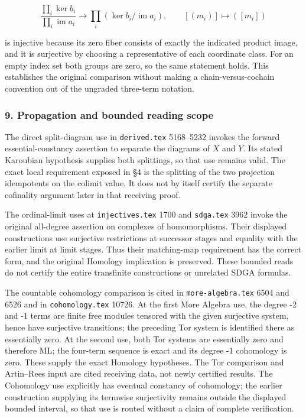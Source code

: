 \documentclass[11pt]{article}
\begin{document}
\[
\frac{\prod_i\ker b_i}{\prod_i\operatorname{im}a_i}
\longrightarrow \prod_i(\ker b_i/\operatorname{im}a_i),
\qquad [(m_i)]\longmapsto([m_i])
\]

is injective because its zero fiber consists of exactly the indicated product image, and it is surjective by choosing a representative of each coordinate class. For an empty index set both groups are zero, so the same statement holds. This establishes the original comparison without making a chain-versus-cochain convention out of the ungraded three-term notation.

\subsubsection{9. Propagation and bounded reading scope}\label{propagation-and-bounded-reading-scope}

The direct split-diagram use in \texttt{derived.tex} 5168--5232 invokes the forward essential-constancy assertion to separate the diagrams of \(X\) and \(Y\). Its stated Karoubian hypothesis supplies both splittings, so that use remains valid. The exact local requirement exposed in §4 is the splitting of the two projection idempotents on the colimit value. It does not by itself certify the separate cofinality argument later in that receiving proof.

The ordinal-limit uses at \texttt{injectives.tex} 1700 and \texttt{sdga.tex} 3962 invoke the original all-degree assertion on complexes of homomorphisms. Their displayed constructions use surjective restrictions at successor stages and equality with the earlier limit at limit stages. Thus their matching-map requirement has the correct form, and the original Homology implication is preserved. These bounded reads do not certify the entire transfinite constructions or unrelated SDGA formulas.

The countable cohomology comparison is cited in \texttt{more-algebra.tex} 6504 and 6526 and in \texttt{cohomology.tex} 10726. At the first More Algebra use, the degree -2 and -1 terms are finite free modules tensored with the given surjective system, hence have surjective transitions; the preceding Tor system is identified there as essentially zero. At the second use, both Tor systems are essentially zero and therefore ML; the four-term sequence is exact and its degree -1 cohomology is zero. These supply the exact Homology hypotheses. The Tor comparison and Artin--Rees input are cited receiving data, not newly certified results. The Cohomology use explicitly has eventual constancy of cohomology; the earlier construction supplying its termwise surjectivity remains outside the displayed bounded interval, so that use is routed without a claim of complete verification.
\end{document}
